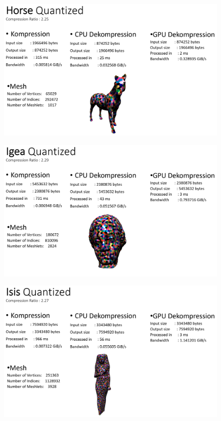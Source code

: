 \begin{figure}[h]
  \centering  
  \includegraphics[scale=0.28]{Bilder/ergebnisse_full/horse_quantized.png}
\end{figure}
\begin{figure}[h]
  \centering  
  \includegraphics[scale=0.28]{Bilder/ergebnisse_full/igea_quantized.png}
\end{figure}
\begin{figure}[h]
  \centering  
  \includegraphics[scale=0.28]{Bilder/ergebnisse_full/isis_quantized.png}
\end{figure}
